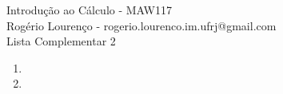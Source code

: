 \documentclass{article}
\begin{document}
\begin{flushleft}
	Introdução ao Cálculo - MAW117\\
	Rogério Lourenço - rogerio.lourenco.im.ufrj@gmail.com\\
	Lista Complementar 2
\end{flushleft}

\begin{enumerate}
	\item 
	\item 
\end{enumerate}
\end{document}
